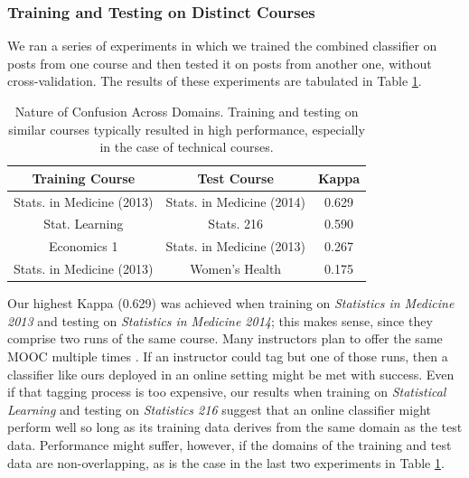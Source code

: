 \documentclass{edm_template}
\begin{document}
\subsubsection{Training and Testing on Distinct Courses}
We ran a series of experiments in which we trained the combined classifier on posts from one course and then tested it on posts from another one, without cross-validation. The results of these experiments are tabulated in Table \ref{table:across_courses}. 

\begin{table}[]
       \centering
       \begin{tabular}{|c|c|c|}
       \hline
       Training Course                & Test Course                    & Kappa \\ \hline
       Stats. in Medicine (2013)  & Stats. in Medicine (2014)  & 0.629 \\ \hline
       Stat. Learning           & Stats. 216                 & 0.590 \\ \hline
       Economics 1                    & Stats. in Medicine (2013)  & 0.267 \\ \hline
       Stats. in Medicine (2013)  & Women's Health                 & 0.175 \\ \hline
       \end{tabular}
       \caption{\textnormal{
       Nature of Confusion Across Domains. Training and testing on similar courses typically resulted in high performance, especially in the case of technical courses.
       }} 
       \label{table:across_courses} %
\end{table}


Our highest Kappa (0.629) was achieved when training on \emph{Statistics in Medicine 2013} and testing on \emph{Statistics in Medicine 2014}; this makes sense, since they comprise two runs of the same course. Many instructors plan to offer the same MOOC multiple times \cite{hollands2014moocs}. If an instructor could tag but one of those runs, then a classifier like ours deployed in an online setting might be met with success. Even if that tagging process is too expensive, our results when training on \emph{Statistical Learning} and testing on \emph{Statistics 216} suggest that an online classifier might perform well so long as its training data derives from the same domain as the test data. Performance might suffer, however, if the domains of the training and test data are non-overlapping, as is the case in the last two experiments in Table \ref{table:across_courses}.
\end{document}
